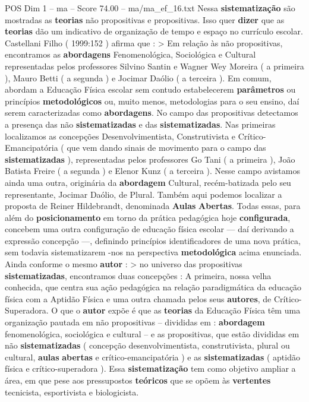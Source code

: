 \begin{textsample}{POS Dim 1 – ma – Score 74.00 – ma/ma\_ef\_16.txt}
Nessa \textbf{sistematização} são mostradas as \textbf{teorias} não propositivas e propositivas.
Isso quer \textbf{dizer} que as \textbf{teorias} dão um indicativo de organização de tempo e espaço no currículo escolar.
Castellani Filho ( 1999:152 ) afirma que : > Em relação às não propositivas, encontramos as \textbf{abordagens} Fenomenológica, Sociológica e Cultural representadas pelos professores Silvino Santin e Wagner Wey Moreira ( a primeira ), Mauro Betti ( a segunda ) e Jocimar Daólio ( a terceira ).
Em comum, abordam a Educação Física escolar sem contudo estabelecerem \textbf{parâmetros} ou princípios \textbf{metodológicos} ou, muito menos, metodologias para o seu ensino, daí serem caracterizadas como \textbf{abordagens}.
No campo das propositivas detectamos a presença das não \textbf{sistematizadas} e das \textbf{sistematizadas}.
Nas primeiras localizamos as concepções Desenvolvimentista, Construtivista e Crítico-Emancipatória ( que vem dando sinais de movimento para o campo das \textbf{sistematizadas} ), representadas pelos professores Go Tani ( a primeira ), João Batista Freire ( a segunda ) e Elenor Kunz ( a terceira ).
Nesse campo avistamos ainda uma outra, originária da \textbf{abordagem} Cultural, recém-batizada pelo seu representante, Jocimar Daólio, de Plural.
Também aqui podemos localizar a proposta de Reiner Hildebrandt, denominada \textbf{Aulas} \textbf{Abertas}.
Todas essas, para além do \textbf{posicionamento} em torno da prática pedagógica hoje \textbf{configurada}, concebem uma outra configuração de educação física escolar — daí derivando a expressão concepção —, definindo princípios identificadores de uma nova prática, sem todavia sistematizarem -nos na perspectiva \textbf{metodológica} acima enunciada.
Ainda conforme o mesmo \textbf{autor} : > no universo das propositivas \textbf{sistematizadas}, encontramos duas concepções : A primeira, nossa velha conhecida, que centra sua ação pedagógica na relação paradigmática da educação física com a Aptidão Física e uma outra chamada pelos seus \textbf{autores}, de Crítico-Superadora.
O que o \textbf{autor} expõe é que as \textbf{teorias} da Educação Física têm uma organização pautada em não propositivas – divididas em : \textbf{abordagem} fenomenológica, sociológica e cultural – e as propositivas, que estão divididas em não \textbf{sistematizadas} ( concepção desenvolvimentista, construtivista, plural ou cultural, \textbf{aulas} \textbf{abertas} e crítico-emancipatória ) e as \textbf{sistematizadas} ( aptidão física e crítico-superadora ).
Essa \textbf{sistematização} tem como objetivo ampliar a área, em que pese aos pressupostos \textbf{teóricos} que se opõem às \textbf{vertentes} tecnicista, esportivista e biologicista.

\end{textsample}
